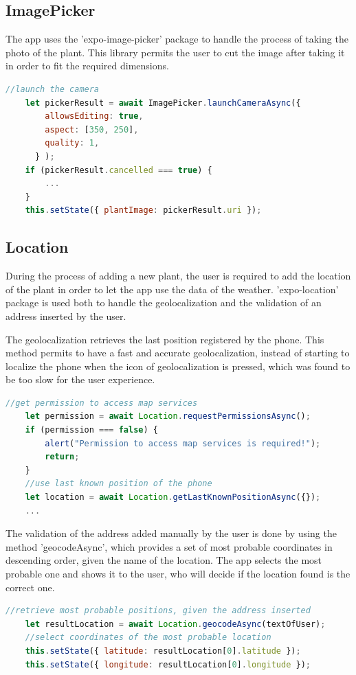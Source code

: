 \documentclass[10pt]{article}
\begin{document}
	\subsection{ImagePicker}
	The app uses the 'expo-image-picker' package to handle the process of taking the photo of the plant. This library permits the user to cut the image after taking it in order to fit the required dimensions.
	
	\begin{lstlisting}[language=JavaScript]
    //launch the camera
    let pickerResult = await ImagePicker.launchCameraAsync({
        allowsEditing: true,
        aspect: [350, 250],
        quality: 1,
      } );
    if (pickerResult.cancelled === true) {
        ...
    }
    this.setState({ plantImage: pickerResult.uri });
	\end{lstlisting}
	
	\subsection{Location}
	During the process of adding a new plant, the user is required to add the location of the plant in order to let the app use the data of the weather. 'expo-location' package is used both to handle the geolocalization and the validation of an address inserted by the user.
	
	The geolocalization retrieves the last position registered by the phone. This method permits to have a fast and accurate geolocalization, instead of starting to localize the phone when the icon of geolocalization is pressed, which was found to be too slow for the user experience.
	\begin{lstlisting}[language=JavaScript]
    //get permission to access map services
    let permission = await Location.requestPermissionsAsync();
    if (permission === false) {
        alert("Permission to access map services is required!");
        return;
    }
    //use last known position of the phone
    let location = await Location.getLastKnownPositionAsync({});
    ...
	\end{lstlisting}
	
	The validation of the address added manually by the user is done by using the method 'geocodeAsync', which provides a set of most probable coordinates in descending order, given the name of the location. The app selects the most probable one and shows it to the user, who will decide if the location found is the correct one.
	\begin{lstlisting}[language=JavaScript]
    //retrieve most probable positions, given the address inserted
    let resultLocation = await Location.geocodeAsync(textOfUser);
    //select coordinates of the most probable location
    this.setState({ latitude: resultLocation[0].latitude });
    this.setState({ longitude: resultLocation[0].longitude });
    \end{lstlisting}
	
\end{document}
